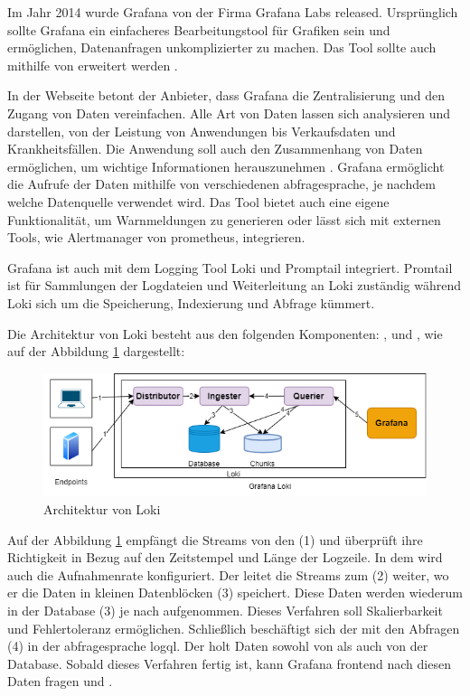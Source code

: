 Im Jahr 2014 wurde Grafana von der Firma Grafana Labs released. Ursprünglich sollte Grafana ein einfacheres Bearbeitungstool für Grafiken sein und ermöglichen, Datenanfragen unkomplizierter zu machen. Das Tool sollte auch  mithilfe von  erweitert werden \citep{Oedegaard_historyGrafana}.

In der Webseite betont der Anbieter, dass Grafana die Zentralisierung und den Zugang von Daten vereinfachen. Alle Art von Daten lassen sich analysieren und darstellen, von der Leistung von Anwendungen bis Verkaufsdaten und Krankheitsfällen. Die Anwendung soll auch den Zusammenhang von Daten ermöglichen, um wichtige Informationen herauszunehmen \citep{Grafana_Grafana}. Grafana ermöglicht die Aufrufe der Daten mithilfe von verschiedenen \gls{abfragesprache}, je nachdem welche Datenquelle verwendet wird. Das Tool bietet auch eine eigene Funktionalität, um Warnmeldungen zu generieren oder lässt sich mit externen Tools, wie Alertmanager von \gls{prometheus}, integrieren. 

Grafana ist auch mit dem Logging Tool Loki und Promptail integriert. Promtail ist für Sammlungen der Logdateien und Weiterleitung an Loki zuständig während Loki sich um die Speicherung, Indexierung und Abfrage kümmert.

Die Architektur von Loki besteht aus den folgenden Komponenten: ,  und , wie auf der Abbildung
\ref{fig:Loki-Architektur} dargestellt:

\begin{figure}[H]
   \centering
   \includegraphics[width=1\textwidth]{assets/LokiArchitektur.drawio.png}
   \caption[Architektur von Loki]
   {Architektur von Loki \cite{Grafana_LokiArchitektur2}}
   \label{fig:Loki-Architektur}
   \centering
 \end{figure}
 
Auf der Abbildung \ref{fig:Loki-Architektur} empfängt   die Streams von den (1)  und überprüft ihre Richtigkeit in Bezug auf den Zeitstempel und Länge der Logzeile. In dem  wird auch die Aufnahmenrate konfiguriert. Der  leitet die Streams zum (2)  weiter, wo er die Daten in kleinen Datenblöcken (3) speichert. Diese Daten werden wiederum in der Database (3) je nach  aufgenommen. Dieses Verfahren soll Skalierbarkeit und Fehlertoleranz ermöglichen. Schließlich beschäftigt sich der  mit den Abfragen (4) in der \gls{abfragesprache} \gls{logql}. Der  holt Daten sowohl von  als auch von der Database. Sobald dieses Verfahren fertig ist, kann Grafana \gls{frontend} nach diesen Daten fragen \citep{Grafana_LokiArchitektur} und \citep{Grafana_LokiArchitektur2}.

